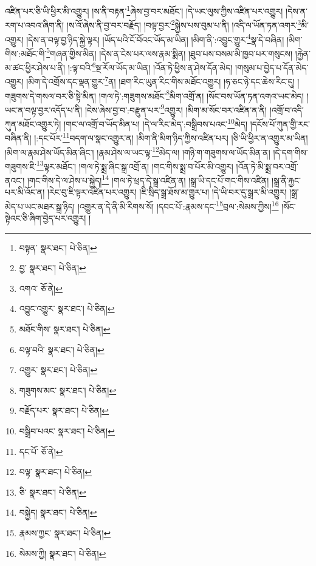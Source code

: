 འཛིན་པར་ཅི་ཡི་ཕྱིར་མི་འགྱུར། །ས་ནི་བརྟན་\footnote{བསྟན་  སྣར་ཐང་།  པེ་ཅིན། }ཞེས་བྱ་བར་མཐོང་། །དེ་ཡང་ལུས་ཀྱིས་འཛིན་པར་འགྱུར། །དེས་ན་རག་པ་འབའ་ཞིག་ནི། །ས་འོ་ཞེས་ནི་བྱ་བར་བརྗོད། །བལྟ་བྱར་\footnote{བྱ་  སྣར་ཐང་།  པེ་ཅིན། }སྐྱེས་པས་བུམ་པ་ནི། །འདི་ལ་ཡོན་ཏན་འགར་\footnote{འགའ་  ཅོ་ནེ། }མི་འགྱུར། །དེས་ན་བལྟ་བྱ་ཉིད་སྐྱེ་ལྟར། །ཡོད་པའི་ངོ་བོའང་ཡོད་མ་ཡིན། །མིག་ནི་:འབྱུང་གྱུར་\footnote{འབྱུང་འགྱུར་  སྣར་ཐང་།  པེ་ཅིན། }སྣ་དེ་བཞིན། །མིག་གིས་:མཐོང་གི་\footnote{མཐོང་གིས་  སྣར་ཐང་།  པེ་ཅིན། }གཞན་གྱིས་མིན། །དེས་ན་ངེས་པར་ལས་རྣམ་སྨིན། །ཐུབ་པས་བསམ་མི་ཁྱབ་པར་གསུངས། །རྐྱེན་མ་ཚང་ཕྱིར་ཤེས་པ་ནི། །:ལྟ་བའི་\footnote{བལྟ་བའི་  སྣར་ཐང་།  པེ་ཅིན། }སྔ་རོལ་ཡོད་མ་ཡིན། །འོན་ཏེ་ཕྱིས་ན་ཤེས་དོན་མེད། །གསུམ་པ་བྱེད་པ་དོན་མེད་འགྱུར། །མིག་དེ་འགྲོས་དང་ལྡན་གྱུར་\footnote{འགྱུར་  སྣར་ཐང་།  པེ་ཅིན། }ན། །ཐག་རིང་ཡུན་རིང་གིས་མཐོང་འགྱུར། །ཧ་ཅང་ཉེ་དང་ཆེས་རིང་དུ། །གཟུགས་དེ་གསལ་བར་ཅི་སྟེ་མིན། །གལ་ཏེ་:གཟུགས་མཐོང་\footnote{གཟུགས་མང་  སྣར་ཐང་།  པེ་ཅིན། }མིག་འགྲོ་ན། །སོང་བས་ཡོན་ཏན་འགའ་ཡང་མེད། །ཡང་ན་བལྟ་བྱར་འདོད་པ་ནི། །ངེས་ཞེས་བྱ་བ་:བརྫུན་པར་\footnote{བརྗོད་པར་  སྣར་ཐང་།  པེ་ཅིན། }འགྱུར། །མིག་མ་སོང་བར་འཛིན་ན་ནི། །འགྲོ་བ་འདི་ཀུན་མཐོང་འགྱུར་ཏེ། །གང་ལ་འགྲོ་བ་ཡོད་མིན་པ། །དེ་ལ་རིང་མེད་:བསྒྲིབས་པའང་\footnote{བསྒྲིབ་པའང་  སྣར་ཐང་།  པེ་ཅིན། }མེད། །དངོས་པོ་ཀུན་གྱི་རང་བཞིན་ནི། །:དང་པོར་\footnote{དང་པོ་  ཅོ་ནེ། }བདག་ལ་སྣང་འགྱུར་ན། །མིག་ནི་མིག་ཉིད་ཀྱིས་འཛིན་པར། །ཅི་ཡི་ཕྱིར་ན་འགྱུར་མ་ཡིན། །མིག་ལ་རྣམ་ཤེས་ཡོད་མིན་ཞིང་། །རྣམ་ཤེས་ལ་ཡང་ལྟ་\footnote{བལྟ་  སྣར་ཐང་།  པེ་ཅིན། }མེད་ལ། །གཉི་ག་གཟུགས་ལ་ཡོད་མིན་ན། །དེ་དག་གིས་གཟུགས་ཇི་\footnote{ཅི་  སྣར་ཐང་།  པེ་ཅིན། }ལྟར་མཐོང་། །གལ་ཏེ་སྨྲ་ཞིང་སྒྲ་འགྲོ་ན། །གང་གིས་སྨྲ་བ་པོར་མི་འགྱུར། །འོན་ཏེ་མི་སྨྲ་བར་འགྲོ་ནའང་། །གང་གིས་དེ་ལ་ཤེས་པ་སྐྱེད།\footnote{བསྐྱེད།  སྣར་ཐང་།  པེ་ཅིན། } །གལ་ཏེ་ཕྲད་དེ་སྒྲ་འཛིན་ན། །སྒྲ་ཡི་དང་པོ་གང་གིས་འཛིན། །སྒྲ་ནི་རྐྱང་པར་མི་འོང་ན། །རེང་བུ་ཇི་ལྟར་འཛིན་པར་འགྱུར། །ཇི་སྲིད་སྒྲ་ཐོས་མ་གྱུར་པ། །དེ་ཡི་བར་དུ་སྒྲར་མི་འགྱུར། །སྒྲ་མེད་པ་ཡང་མཐར་སྒྲ་ཉིད། །འགྱུར་ན་དེ་ནི་མི་རིགས་སོ། །དབང་པོ་:རྣམས་དང་\footnote{རྣམས་ཀྱང་  སྣར་ཐང་།  པེ་ཅིན། }བྲལ་:སེམས་ཀྱིས།\footnote{སེམས་ཀྱི།  སྣར་ཐང་།  པེ་ཅིན། } །སོང་སྟེའང་ཅི་ཞིག་བྱེད་པར་འགྱུར། །
